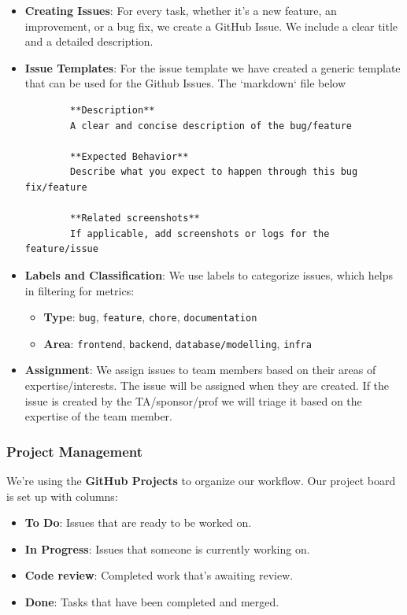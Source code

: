 \documentclass{article}
\begin{document}
\begin{itemize}
    \item \textbf{Creating Issues}: For every task, whether it's a new feature, an improvement, or a bug fix, we create a GitHub Issue. We include a clear title and a detailed description.

    \item \textbf{Issue Templates}: For the issue template we have created a generic template that can be used for the Github Issues. The `markdown` file below

    \begin{verbatim}
        **Description**
        A clear and concise description of the bug/feature

        **Expected Behavior**
        Describe what you expect to happen through this bug fix/feature

        **Related screenshots**
        If applicable, add screenshots or logs for the feature/issue
    \end{verbatim}

    \item \textbf{Labels and Classification}: We use labels to categorize issues, which helps in filtering for metrics:

    \begin{itemize}
        \item \textbf{Type}: \texttt{bug}, \texttt{feature}, \texttt{chore}, \texttt{documentation}

        \item \textbf{Area}: \texttt{frontend}, \texttt{backend}, \texttt{database/modelling}, \texttt{infra}
    \end{itemize}

    \item \textbf{Assignment}: We assign issues to team members based on their areas of expertise/interests. The issue will be assigned when they are created. If the issue is created by the TA/sponsor/prof we will triage it based on the expertise of the team member.
\end{itemize}

\subsubsection{Project Management}

We're using the \textbf{GitHub Projects} to organize our workflow. Our project board is set up with columns:

\begin{itemize}
    \item \textbf{To Do}: Issues that are ready to be worked on.

    \item \textbf{In Progress}: Issues that someone is currently working on.

    \item \textbf{Code review}: Completed work that's awaiting review.

    \item \textbf{Done}: Tasks that have been completed and merged.
\end{itemize}
\end{document}
